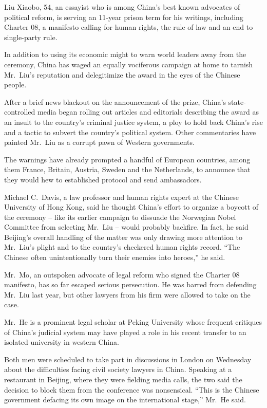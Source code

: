 ﻿\documentclass[12pt]{article}
\begin{document}
Liu Xiaobo, 54, an essayist who is among China's best known advocates of political reform, is
serving an 11-year prison term for his writings, including Charter 08, a manifesto calling for human
rights, the rule of law and an end to single-party rule.

In addition to using its economic might to warn world leaders away from the ceremony, China has
waged an equally vociferous campaign at home to tarnish Mr.~Liu's reputation and delegitimize the
award in the eyes of the Chinese people.

After a brief news blackout on the announcement of the prize, China's state-controlled media began
rolling out articles and editorials describing the award as an insult to the country's criminal
justice system, a ploy to hold back China's rise and a tactic to subvert the country's political
system. Other commentaries have painted Mr.~Liu as a corrupt pawn of Western governments.

The warnings have already prompted a handful of European countries, among them France, Britain,
Austria, Sweden and the Netherlands, to announce that they would hew to established protocol and
send ambassadors.

Michael C.~Davis, a law professor and human rights expert at the Chinese University of Hong Kong,
said he thought China's effort to organize a boycott of the ceremony -- like its earlier campaign to
dissuade the Norwegian Nobel Committee from selecting Mr.~Liu -- would probably backfire. In fact,
he said Beijing's overall handling of the matter was only drawing more attention to Mr.~Liu's plight
and to the country's checkered human rights record. ``The Chinese often unintentionally turn their
enemies into heroes,'' he said.

Mr.~Mo, an outspoken advocate of legal reform who signed the Charter 08 manifesto, has so far
escaped serious persecution. He was barred from defending Mr.~Liu last year, but other lawyers from
his firm were allowed to take on the case.

Mr.~He is a prominent legal scholar at Peking University whose frequent critiques of China's
judicial system may have played a role in his recent transfer to an isolated university in western
China.

Both men were scheduled to take part in discussions in London on Wednesday about the difficulties
facing civil society lawyers in China. Speaking at a restaurant in Beijing, where they were fielding
media calls, the two said the decision to block them from the conference was nonsensical. ``This is
the Chinese government defacing its own image on the international stage,'' Mr.~He said.
\end{document}
